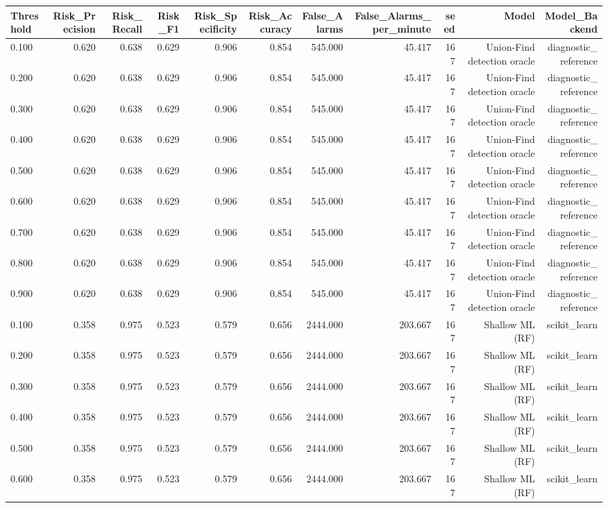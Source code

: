 \begin{tabular}{lrrrrrrrrrr}
\toprule
Threshold & Risk\_Precision & Risk\_Recall & Risk\_F1 & Risk\_Specificity & Risk\_Accuracy & False\_Alarms & False\_Alarms\_per\_minute & seed & Model & Model\_Backend \\
\midrule
0.100 & 0.620 & 0.638 & 0.629 & 0.906 & 0.854 & 545.000 & 45.417 & 167 & Union-Find detection oracle & diagnostic\_reference \\
0.200 & 0.620 & 0.638 & 0.629 & 0.906 & 0.854 & 545.000 & 45.417 & 167 & Union-Find detection oracle & diagnostic\_reference \\
0.300 & 0.620 & 0.638 & 0.629 & 0.906 & 0.854 & 545.000 & 45.417 & 167 & Union-Find detection oracle & diagnostic\_reference \\
0.400 & 0.620 & 0.638 & 0.629 & 0.906 & 0.854 & 545.000 & 45.417 & 167 & Union-Find detection oracle & diagnostic\_reference \\
0.500 & 0.620 & 0.638 & 0.629 & 0.906 & 0.854 & 545.000 & 45.417 & 167 & Union-Find detection oracle & diagnostic\_reference \\
0.600 & 0.620 & 0.638 & 0.629 & 0.906 & 0.854 & 545.000 & 45.417 & 167 & Union-Find detection oracle & diagnostic\_reference \\
0.700 & 0.620 & 0.638 & 0.629 & 0.906 & 0.854 & 545.000 & 45.417 & 167 & Union-Find detection oracle & diagnostic\_reference \\
0.800 & 0.620 & 0.638 & 0.629 & 0.906 & 0.854 & 545.000 & 45.417 & 167 & Union-Find detection oracle & diagnostic\_reference \\
0.900 & 0.620 & 0.638 & 0.629 & 0.906 & 0.854 & 545.000 & 45.417 & 167 & Union-Find detection oracle & diagnostic\_reference \\
0.100 & 0.358 & 0.975 & 0.523 & 0.579 & 0.656 & 2444.000 & 203.667 & 167 & Shallow ML (RF) & scikit\_learn \\
0.200 & 0.358 & 0.975 & 0.523 & 0.579 & 0.656 & 2444.000 & 203.667 & 167 & Shallow ML (RF) & scikit\_learn \\
0.300 & 0.358 & 0.975 & 0.523 & 0.579 & 0.656 & 2444.000 & 203.667 & 167 & Shallow ML (RF) & scikit\_learn \\
0.400 & 0.358 & 0.975 & 0.523 & 0.579 & 0.656 & 2444.000 & 203.667 & 167 & Shallow ML (RF) & scikit\_learn \\
0.500 & 0.358 & 0.975 & 0.523 & 0.579 & 0.656 & 2444.000 & 203.667 & 167 & Shallow ML (RF) & scikit\_learn \\
0.600 & 0.358 & 0.975 & 0.523 & 0.579 & 0.656 & 2444.000 & 203.667 & 167 & Shallow ML (RF) & scikit\_learn \\

\end{tabular}
